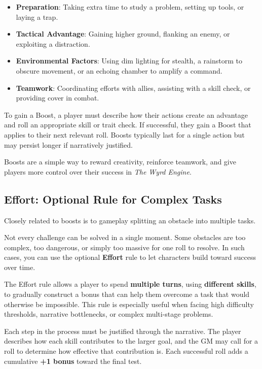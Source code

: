 \begin{itemize}
    \item \textbf{Preparation}: Taking extra time to study a problem, setting up tools, or laying a trap.  
    \item \textbf{Tactical Advantage}: Gaining higher ground, flanking an enemy, or exploiting a distraction.  
    \item \textbf{Environmental Factors}: Using dim lighting for stealth, a rainstorm to obscure movement, or an echoing chamber to amplify a command.  
    \item \textbf{Teamwork}: Coordinating efforts with allies, assisting with a skill check, or providing cover in combat.  
\end{itemize}

To gain a Boost, a player must describe how their actions create an advantage and roll an appropriate skill or trait check. If successful, they gain a Boost that applies to their next relevant roll. Boosts typically last for a single action but may persist longer if narratively justified.  

Boosts are a simple way to reward creativity, reinforce teamwork, and give players more control over their success in \textit{The Wyrd Engine}.

\subsection{Effort: Optional Rule for Complex Tasks}

Closely related to boosts is to gameplay splitting an obstacle into multiple tasks.

Not every challenge can be solved in a single moment. Some obstacles are too complex, too dangerous, or simply too massive for one roll to resolve. In such cases, you can use the optional \textbf{Effort} rule to let characters build toward success over time.

The Effort rule allows a player to spend \textbf{multiple turns}, using \textbf{different skills}, to gradually construct a bonus that can help them overcome a task that would otherwise be impossible. This rule is especially useful when facing high difficulty thresholds, narrative bottlenecks, or complex multi-stage problems.

Each step in the process must be justified through the narrative. The player describes how each skill contributes to the larger goal, and the GM may call for a roll to determine how effective that contribution is. Each successful roll adds a cumulative \textbf{+1 bonus} toward the final test.


